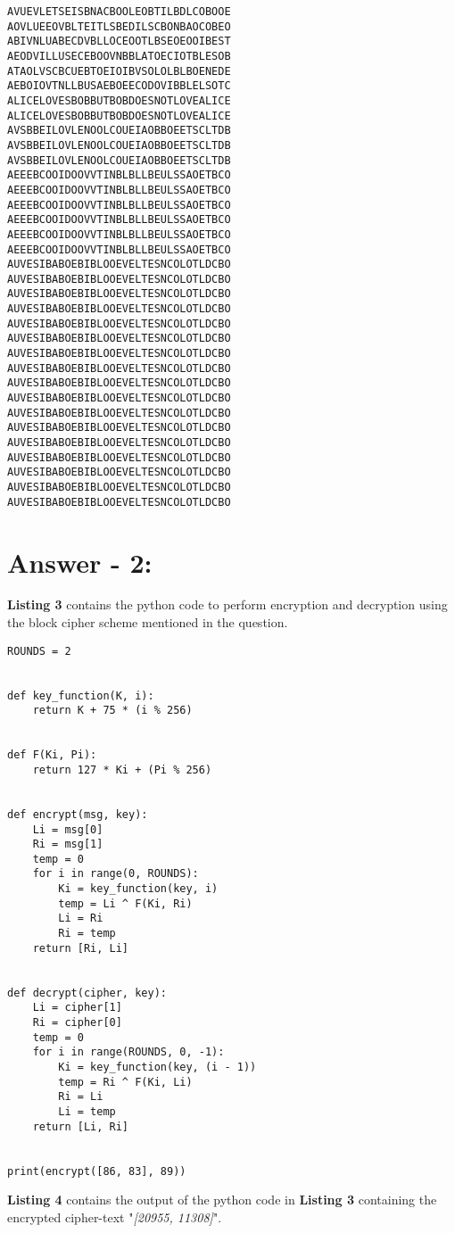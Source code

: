 \documentclass[10pt,a4paper,oneside]{article}
\begin{document}
\lstset{keywordstyle=\bfseries}
\begin{lstlisting}
AVUEVLETSEISBNACBOOLEOBTILBDLCOBOOE
AOVLUEEOVBLTEITLSBEDILSCBONBAOCOBEO
ABIVNLUABECDVBLLOCEOOTLBSEOEOOIBEST
AEODVILLUSECEBOOVNBBLATOECIOTBLESOB
ATAOLVSCBCUEBTOEIOIBVSOLOLBLBOENEDE
AEBOIOVTNLLBUSAEBOEECODOVIBBLELSOTC
ALICELOVESBOBBUTBOBDOESNOTLOVEALICE
ALICELOVESBOBBUTBOBDOESNOTLOVEALICE
AVSBBEILOVLENOOLCOUEIAOBBOEETSCLTDB
AVSBBEILOVLENOOLCOUEIAOBBOEETSCLTDB
AVSBBEILOVLENOOLCOUEIAOBBOEETSCLTDB
AEEEBCOOIDOOVVTINBLBLLBEULSSAOETBCO
AEEEBCOOIDOOVVTINBLBLLBEULSSAOETBCO
AEEEBCOOIDOOVVTINBLBLLBEULSSAOETBCO
AEEEBCOOIDOOVVTINBLBLLBEULSSAOETBCO
AEEEBCOOIDOOVVTINBLBLLBEULSSAOETBCO
AEEEBCOOIDOOVVTINBLBLLBEULSSAOETBCO
AUVESIBABOEBIBLOOEVELTESNCOLOTLDCBO
AUVESIBABOEBIBLOOEVELTESNCOLOTLDCBO
AUVESIBABOEBIBLOOEVELTESNCOLOTLDCBO
AUVESIBABOEBIBLOOEVELTESNCOLOTLDCBO
AUVESIBABOEBIBLOOEVELTESNCOLOTLDCBO
AUVESIBABOEBIBLOOEVELTESNCOLOTLDCBO
AUVESIBABOEBIBLOOEVELTESNCOLOTLDCBO
AUVESIBABOEBIBLOOEVELTESNCOLOTLDCBO
AUVESIBABOEBIBLOOEVELTESNCOLOTLDCBO
AUVESIBABOEBIBLOOEVELTESNCOLOTLDCBO
AUVESIBABOEBIBLOOEVELTESNCOLOTLDCBO
AUVESIBABOEBIBLOOEVELTESNCOLOTLDCBO
AUVESIBABOEBIBLOOEVELTESNCOLOTLDCBO
AUVESIBABOEBIBLOOEVELTESNCOLOTLDCBO
AUVESIBABOEBIBLOOEVELTESNCOLOTLDCBO
AUVESIBABOEBIBLOOEVELTESNCOLOTLDCBO
AUVESIBABOEBIBLOOEVELTESNCOLOTLDCBO
\end{lstlisting}

\section*{Answer - 2:}

\textbf{Listing 3} contains the python code to perform encryption and decryption using the block cipher scheme mentioned in the question. 

\begin{lstlisting}
ROUNDS = 2


def key_function(K, i):
    return K + 75 * (i % 256)


def F(Ki, Pi):
    return 127 * Ki + (Pi % 256)


def encrypt(msg, key):
    Li = msg[0]
    Ri = msg[1]
    temp = 0
    for i in range(0, ROUNDS):
        Ki = key_function(key, i)
        temp = Li ^ F(Ki, Ri)
        Li = Ri
        Ri = temp
    return [Ri, Li]


def decrypt(cipher, key):
    Li = cipher[1]
    Ri = cipher[0]
    temp = 0
    for i in range(ROUNDS, 0, -1):
        Ki = key_function(key, (i - 1))
        temp = Ri ^ F(Ki, Li)
        Ri = Li
        Li = temp
    return [Li, Ri]


print(encrypt([86, 83], 89))
\end{lstlisting}
\textbf{Listing 4} contains the output of the python code in \textbf{Listing 3} containing the encrypted cipher-text "\textit{[20955, 11308]}".
\end{document}
